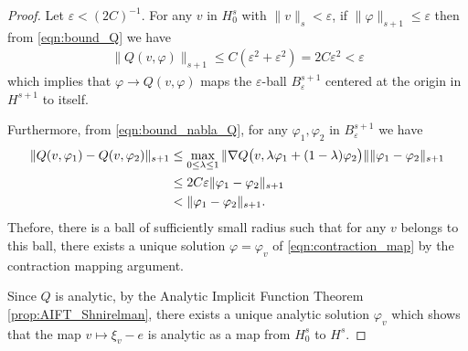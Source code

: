 \documentclass[10pt,a4paper]{amsart}
\begin{document}
\begin{proof}
Let $\varepsilon<(2C)^{-1}$. For any $v$ in $H_0^s$ with $\|v\|_{s}<\varepsilon$, if $\|\varphi\|_{s+1}\le \varepsilon$  then from \eqref{eqn:bound_Q} we have 
 \begin{align}
    	\|Q(v,\varphi)\|_{s+1}\le C(\varepsilon^2+\varepsilon^2)=2C\varepsilon^2< \varepsilon
    \end{align}
which implies that $\varphi \rightarrow Q(v,\varphi)$ maps the $\varepsilon$-ball $B_{\varepsilon}^{s+1}$ centered at the origin in $H^{s+1}$ to itself. 
   
Furthermore, from \eqref{eqn:bound_nabla_Q}, for any $\varphi_1,\varphi_2$ in $B_{\varepsilon}^{s+1}$ we have 
%
    \begin{align}
    \|Q(v,\varphi_1)-Q(v,\varphi_2)\|_{s+1}&\le \max_{0\le \lambda\le 1}\|\nabla Q\big(v,\lambda\varphi_1+(1-\lambda)\varphi_2\big)\| \|\varphi_1-\varphi_2\|_{s+1}\notag\\
    &\le 2C\varepsilon \|\varphi_1-\varphi_2\| _{s+1}\\
    &<  \|\varphi_1-\varphi_2\| _{s+1}.\notag
\end{align}
%
    Thefore, there is a ball of sufficiently small radius such that for any $v$ belongs to this ball, there exists a unique solution $\varphi=\varphi_v$ of \eqref{eqn:contraction_map} by the contraction mapping argument. 
    
    Since $Q$ is analytic, by the Analytic Implicit Function Theorem \ref{prop:AIFT_Shnirelman}, there exists a unique analytic solution $\varphi_v$ which shows that the map $v\mapsto\xi_v-e$ is analytic  as a map from $H_0^s$ to $H^s$.

 \end{proof}
\end{document}
